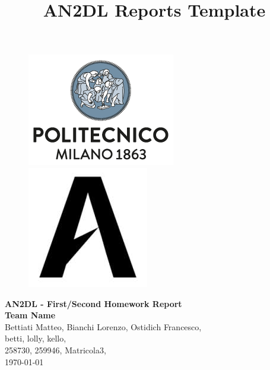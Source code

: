 \documentclass[11pt]{article}
\title{AN2DL Reports Template}
\begin{document}
    
    \begin{figure}[H]
        \raggedright
        \includegraphics[scale=0.4]{polimi.png} \hfill \includegraphics[scale=0.3]{airlab.jpeg}
    \end{figure}
    
    \vspace{5mm}
    
    \begin{center}
        {\Large \textbf{AN2DL - First/Second Homework Report}}\\
        \vspace{2mm}
        {\Large \textbf{Team Name}}\\
        \vspace{2mm}
        {\large Bettiati Matteo,}
        {\large Bianchi Lorenzo,}
        {\large Ostidich Francesco,}\\
        \vspace{2mm}
        {betti,}
        {lolly,}
        {kello,}\\
        \vspace{2mm}
        {258730,}
        {259946,}
        {Matricola3,}\\
        \vspace{5mm}
        \today
    \end{center}    
    \vspace{5mm}
\end{document}
